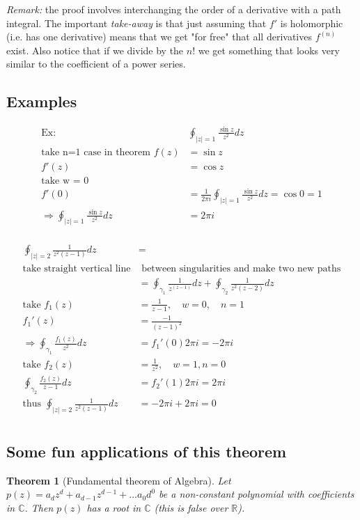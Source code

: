 \documentclass[a4paper, 11pt]{article}
\newtheorem*{theorem}{Theorem}
\begin{document}
	\noindent\textit{Remark:} the proof involves interchanging the order of a derivative with a path integral. The important \textit{take-away} is that just assuming that $f'$ is holomorphic (i.e. has one derivative) means that we get "for free" that all derivatives $f^{(n)}$ exist. Also notice that if we divide by the $n!$ we get something that looks very similar to the coefficient of a power series. \\ 
	
\subsection*{Examples}
	\begin{align*}
		\text{Ex: } \quad &\oint_{|z|=1}\frac{\sin z}{z^2} dz \\ 
		\text{take n=1 case in theorem } f(z) &= \sin z\\ 
		f'(z) &= \cos z \\ 
		\text{take w = 0 }& \\ 
		f'(0) &= \frac{1}{2\pi i}\oint_{|z|=1}\frac{\sin z}{z^2} dz = \cos 0 = 1 \\ 
		\Rightarrow \oint_{|z|=1}\frac{\sin z}{z^2}dz &= 2\pi i \\ 
	\end{align*}
		
	\begin{align*}
		\oint_{|z|=2}\frac{1}{z^2(z-1)}dz &= \\ 
		\text{take straight vertical line}& \text{ between singularities and make two new paths}\\
			&= \oint_{\gamma_1}\frac{1}{z^(z-1)}dz +\oint_{\gamma_2}\frac{1}{z^2(z-2)}dz\\
		\text{take } f_1(z) &= \frac{1}{z-1}, \quad w=0, \quad n=1 \\ 
			f_1'(z) &= \frac{-1}{(z-1)^2} \\ 
			\Rightarrow \oint_{\gamma_1} \frac{f_1(z)}{z^2}dz &= f_1'(0)2\pi i =  -2\pi i \\
		\text{take } f_2(z) &= \frac{1}{z^2}, \quad w=1, n=0 \\ 
			\oint_{\gamma_2}\frac{f_2(z)}{z-1}dz &= f_2'(1)2\pi i = 2\pi i \\ 
		\text{thus } \oint_{|z|=2}\frac{1}{z^2(z-1)}dz &= -2\pi i + 2\pi i = 0 \\
	\end{align*} 
		

\subsection*{Some fun applications of this theorem} 
	\begin{theorem}[Fundamental theorem of Algebra]
		Let $p(z) = a_dz^d + a_{d-1}z^{d-1}+...a_0d^0$ be a non-constant polynomial with coefficients in $\mathbb{C}$. Then $p(z)$ has a root in $\mathbb{C}$ (this is false over $\mathbb{R}$). 
	\end{theorem}
		
\end{document}

